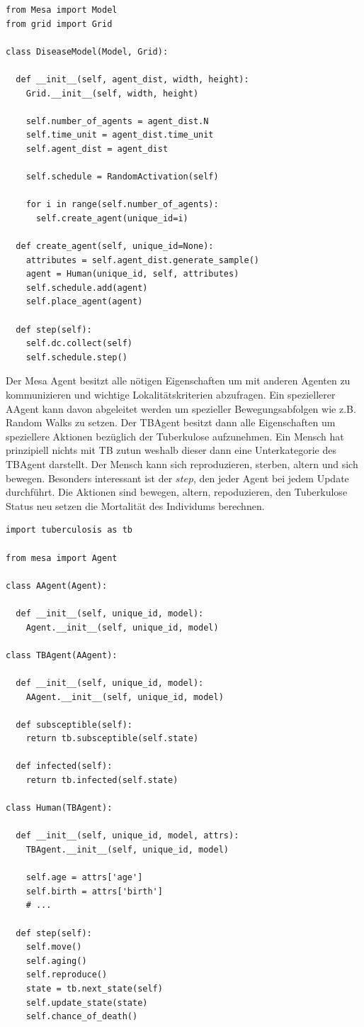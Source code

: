 \documentclass[paper=a4, fontsize=11pt, ngerman, abstract=on]{scrartcl}
\numberwithin{equation}{section} %
\numberwithin{figure}{section} %
\numberwithin{table}{section} %
\begin{document}
\begin{lstlisting}[style=python]
from Mesa import Model
from grid import Grid

class DiseaseModel(Model, Grid):

  def __init__(self, agent_dist, width, height):
    Grid.__init__(self, width, height)

    self.number_of_agents = agent_dist.N
    self.time_unit = agent_dist.time_unit
    self.agent_dist = agent_dist

    self.schedule = RandomActivation(self)

    for i in range(self.number_of_agents):
      self.create_agent(unique_id=i)

  def create_agent(self, unique_id=None):
    attributes = self.agent_dist.generate_sample()
    agent = Human(unique_id, self, attributes)
    self.schedule.add(agent)
    self.place_agent(agent)

  def step(self):
    self.dc.collect(self)
    self.schedule.step()
\end{lstlisting}

Der Mesa Agent besitzt alle nötigen Eigenschaften um mit anderen Agenten zu kommunizieren und wichtige Lokalitätskriterien abzufragen. Ein speziellerer AAgent kann davon abgeleitet werden um spezieller Bewegungsabfolgen wie z.B. Random Walks zu setzen. Der TBAgent besitzt dann alle Eigenschaften um speziellere Aktionen bezüglich der Tuberkulose aufzunehmen. Ein Mensch hat prinzipiell nichts mit TB zutun weshalb dieser dann eine Unterkategorie des TBAgent darstellt. Der Mensch kann sich reproduzieren, sterben, altern und sich bewegen. Besonders interessant ist der $step$, den jeder Agent bei jedem Update durchführt. Die Aktionen sind bewegen, altern, repoduzieren, den Tuberkulose Status neu setzen die Mortalität des Individums berechnen.

\begin{lstlisting}[style=python]
import tuberculosis as tb

from mesa import Agent

class AAgent(Agent):

  def __init__(self, unique_id, model):
    Agent.__init__(self, unique_id, model)

class TBAgent(AAgent):

  def __init__(self, unique_id, model):
    AAgent.__init__(self, unique_id, model)

  def subsceptible(self):
    return tb.subsceptible(self.state)

  def infected(self):
    return tb.infected(self.state)

class Human(TBAgent):

  def __init__(self, unique_id, model, attrs):
    TBAgent.__init__(self, unique_id, model)

    self.age = attrs['age']
    self.birth = attrs['birth']
    # ...

  def step(self):
    self.move()
    self.aging()
    self.reproduce()
    state = tb.next_state(self)
    self.update_state(state)
    self.chance_of_death()
\end{lstlisting}
\end{document}
